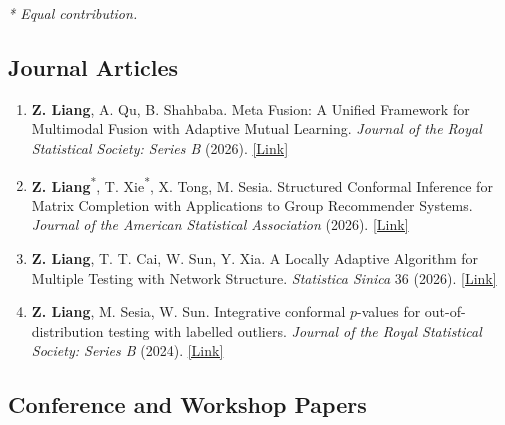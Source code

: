 \documentclass[11pt]{article}
\newcommand{\paperlink}[1]{\href{#1}{[Link]}}
\begin{document}
{\small\textit{* Equal contribution.}}

\subsection*{Journal Articles}

\begin{enumerate}[resume,itemsep=3pt,topsep=1pt]
  \item \textbf{Z. Liang}, A. Qu, B. Shahbaba. Meta Fusion: A Unified Framework for Multimodal Fusion with Adaptive Mutual Learning. \textit{Journal of the Royal Statistical Society: Series B} (2026). \paperlink{https://academic.oup.com/jrsssb/advance-article/doi/10.1093/jrsssb/qkag129/8859170}

  \item \textbf{Z. Liang}\textsuperscript{*}, T. Xie\textsuperscript{*}, X. Tong, M. Sesia. Structured Conformal Inference for Matrix Completion with Applications to Group Recommender Systems. \textit{Journal of the American Statistical Association} (2026). \paperlink{https://doi.org/10.1080/01621459.2026.2658287}

  \item \textbf{Z. Liang}, T. T. Cai, W. Sun, Y. Xia. A Locally Adaptive Algorithm for Multiple Testing with Network Structure. \textit{Statistica Sinica} 36 (2026). \paperlink{https://doi.org/10.5705/ss.202024.0002}

  \item \textbf{Z. Liang}, M. Sesia, W. Sun. Integrative conformal $p$-values for out-of-distribution testing with labelled outliers. \textit{Journal of the Royal Statistical Society: Series B} (2024). \paperlink{https://doi.org/10.1093/jrsssb/qkad138}
\end{enumerate}

\subsection*{Conference and Workshop Papers}
\end{document}

